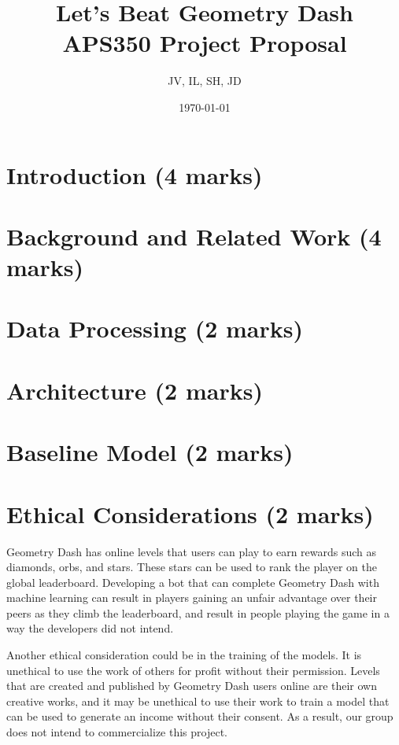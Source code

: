 \documentclass{article}
\title{%
  Let's Beat Geometry Dash \\
  \large APS350 Project Proposal
  }
\author{JV, IL, SH, JD}
\date{\today}
\begin{document}
\maketitle

\pagebreak
\section{Introduction (4 marks)}

\section{Background and Related Work (4 marks)}

\section{Data Processing (2 marks)}

\section{Architecture (2 marks)}

\section{Baseline Model (2 marks)}

\section{Ethical Considerations (2 marks)}
Geometry Dash has online levels that users can play to earn rewards 
such as diamonds, orbs, and stars. These stars can be used to rank 
the player on the global leaderboard. Developing a bot that can complete 
Geometry Dash with machine learning can result in players gaining an 
unfair advantage over their peers as they climb the leaderboard, and 
result in people playing the game in a way the developers did not intend.

Another ethical consideration could be in the training of the models. 
It is unethical to use the work of others for profit without their 
permission. Levels that are created and published by Geometry Dash 
users online are their own creative works, and it may be unethical to 
use their work to train a model that can be used to generate an income 
without their consent. As a result, our group does not intend to 
commercialize this project.
\end{document}
